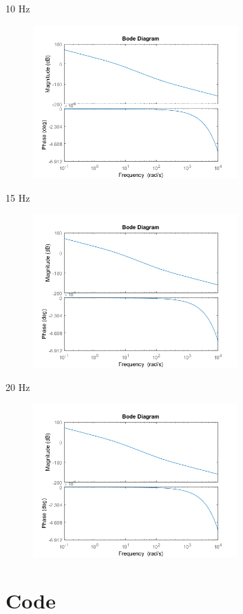 \documentclass{article}
\begin{document}
10 Hz
\begin{figure}[H]
    \centering
    \includegraphics[width=0.7\textwidth]{P4e10hz.png}
\end{figure}
15 Hz
\begin{figure}[H]
    \centering
    \includegraphics[width=0.7\textwidth]{P4e15hz.png}
\end{figure}
20 Hz
\begin{figure}[H]
    \centering
    \includegraphics[width=0.7\textwidth]{P4e20hz.png}
\end{figure}
\section{Code}

\end{document}
